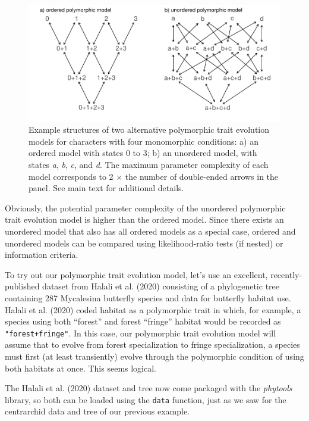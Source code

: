 \documentclass[fleqn,10pt,lineno]{wlpeerj} %
\begin{document}
\begin{figure}
\includegraphics[width=1\linewidth]{Revell.phytools-v2_peerj_files/figure-latex/fig05-structure-polyMk-1} \caption{Example structures of two alternative polymorphic trait evolution models for characters with four monomorphic conditions: a) an ordered model with states 0 to 3; b) an unordered model, with states \textit{a}, \textit{b}, \textit{c}, and \textit{d}. The maximum parameter complexity of each model corresponds to 2 $\times$ the number of double-ended arrows in the panel. See main text for additional details.}\label{fig:fig05-structure-polyMk}
\end{figure}

Obviously, the potential parameter complexity of the unordered polymorphic trait evolution model is higher than the ordered model. Since there exists an unordered model that also has all ordered models as a special case, ordered and unordered models can be compared using likelihood-ratio tests (if nested) or information criteria.

To try out our polymorphic trait evolution model, let's use an excellent, recently-published dataset from Halali et al. (2020) consisting of a phylogenetic tree containing 287 Mycalesina butterfly species and data for butterfly habitat use. Halali et al. (2020) coded habitat as a polymorphic trait in which, for example, a species using both ``forest'' and forest ``fringe'' habitat would be recorded as \texttt{"forest+fringe"}. In this case, our polymorphic trait evolution model will assume that to evolve from forest specialization to fringe specialization, a species must first (at least transiently) evolve through the polymorphic condition of using both habitats at once. This seems logical.

The Halali et al. (2020) dataset and tree now come packaged with the \emph{phytools} library, so both can be loaded using the \texttt{data} function, just as we saw for the centrarchid data and tree of our previous example.
\end{document}
